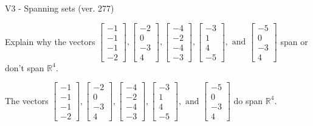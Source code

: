 \begin{exercise}
  \begin{exerciseTitle}V3 - Spanning sets (ver. 277)\end{exerciseTitle}
  \begin{exerciseStatement}
    Explain why the vectors \(\left[\begin{array}{r}
-1 \\
-1 \\
-1 \\
-2
\end{array}\right] , \left[\begin{array}{r}
-2 \\
0 \\
-3 \\
4
\end{array}\right] , \left[\begin{array}{r}
-4 \\
-2 \\
-4 \\
-3
\end{array}\right] , \left[\begin{array}{r}
-3 \\
1 \\
4 \\
-5
\end{array}\right] , \text{ and } \left[\begin{array}{r}
-5 \\
0 \\
-3 \\
4
\end{array}\right]\) span or don't span \(\mathbb{R}^4\). 
	


  \end{exerciseStatement}
  \begin{exerciseAnswer}
   The vectors \(\left[\begin{array}{r}
-1 \\
-1 \\
-1 \\
-2
\end{array}\right] , \left[\begin{array}{r}
-2 \\
0 \\
-3 \\
4
\end{array}\right] , \left[\begin{array}{r}
-4 \\
-2 \\
-4 \\
-3
\end{array}\right] , \left[\begin{array}{r}
-3 \\
1 \\
4 \\
-5
\end{array}\right] , \text{ and } \left[\begin{array}{r}
-5 \\
0 \\
-3 \\
4
\end{array}\right]\) 
  	 do  
	span \(\mathbb{R}^4\).
  



\end{exerciseAnswer}
\end{exercise}
